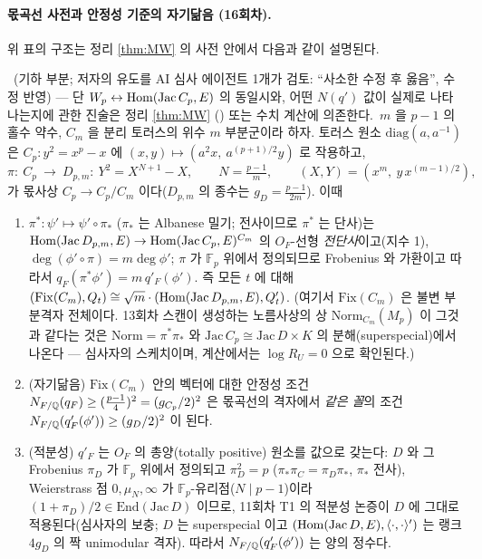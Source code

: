 \paragraph{몫곡선 사전과 안정성 기준의 자기닮음 (16회차).}
위 표의 구조는 정리 \ref{thm:MW} 의 사전 안에서 다음과 같이 설명된다.
\begin{proposition}[몫곡선 사전]\label{prop:quotient}\tagP\ (기하 부분; 저자의 유도를 AI 심사 에이전트 1개가 검토: ``사소한 수정 후 옳음'', 수정 반영) --- 단 $W_p\leftrightarrow\operatorname{Hom}(\mathrm{Jac}\,C_p,E)$ 의 동일시와, 어떤 $N(q')$ 값이 실제로 나타나는지에 관한 진술은 정리 \ref{thm:MW} (\tagPL) 또는 수치 계산에 의존한다.\
$m$ 을 $p-1$ 의 홀수 약수, $C_m$ 을 분리 토러스의 위수 $m$ 부분군이라 하자. 토러스 원소 $\mathrm{diag}(a,a^{-1})$ 은 $C_p:y^2=x^p-x$ 에 $(x,y)\mapsto(a^2x,\ a^{(p+1)/2}y)$ 로 작용하고,
\[
\pi:\ C_p\ \longrightarrow\ D_{p,m}:\ Y^2=X^{N+1}-X,\qquad N=\tfrac{p-1}m,\qquad (X,Y)=(x^m,\ y\,x^{(m-1)/2}),
\]
가 몫사상 $C_p\to C_p/C_m$ 이다($D_{p,m}$ 의 종수는 $g_D=\tfrac{p-1}{2m}$). 이때
\begin{enumerate}
\item $\pi^*:\psi'\mapsto\psi'\circ\pi_*$ ($\pi_*$ 는 Albanese 밀기; 전사이므로 $\pi^*$ 는 단사)는 $\operatorname{Hom}(\mathrm{Jac}\,D_{p,m},E)\to\operatorname{Hom}(\mathrm{Jac}\,C_p,E)^{C_m}$ 의 $O_F$-선형 \emph{전단사}이고(지수 1), $\deg(\phi'\circ\pi)=m\deg\phi'$; $\pi$ 가 $\mathbb F_p$ 위에서 정의되므로 Frobenius 와 가환이고 따라서 $q_F(\pi^*\phi')=m\,q'_F(\phi')$. 즉 모든 $t$ 에 대해 $(\mathrm{Fix}(C_m),Q_t)\cong\sqrt m\cdot(\operatorname{Hom}(\mathrm{Jac}\,D_{p,m},E),Q'_t)$. (여기서 $\mathrm{Fix}(C_m)$ 은 불변 부분격자 전체이다. 13회차 스캔이 생성하는 노름사상의 상 $\mathrm{Norm}_{C_m}(M_p)$ 이 그것과 같다는 것은 $\mathrm{Norm}=\pi^*\pi_*$ 와 $\mathrm{Jac}\,C_p\cong\mathrm{Jac}\,D\times K$ 의 분해(superspecial)에서 나온다 --- 심사자의 스케치이며, 계산에서는 $\log R_U=0$ 으로 확인된다.)
\item (자기닮음) $\mathrm{Fix}(C_m)$ 안의 벡터에 대한 안정성 조건 $N_{F/\mathbb{Q}}(q_F)\ge(\tfrac{p-1}4)^2=(g_{C_p}/2)^2$ 은 몫곡선의 격자에서 \emph{같은 꼴}의 조건 $N_{F/\mathbb{Q}}(q'_F(\phi'))\ge(g_D/2)^2$ 이 된다.
\item (적분성) $q'_F$ 는 $O_F$ 의 총양(totally positive) 원소를 값으로 갖는다: $D$ 와 그 Frobenius $\pi_D$ 가 $\mathbb F_p$ 위에서 정의되고 $\pi_D^2=p$ ($\pi_*\pi_C=\pi_D\pi_*$, $\pi_*$ 전사), Weierstrass 점 $0,\mu_N,\infty$ 가 $\mathbb F_p$-유리점($N\mid p-1$)이라 $(1+\pi_D)/2\in\mathrm{End}(\mathrm{Jac}\,D)$ 이므로, 11회차 T1 의 적분성 논증이 $D$ 에 그대로 적용된다(심사자의 보충; $D$ 는 superspecial 이고 $(\operatorname{Hom}(\mathrm{Jac}\,D,E),\langle\cdot,\cdot\rangle')$ 는 랭크 $4g_D$ 의 짝 unimodular 격자). 따라서 $N_{F/\mathbb{Q}}(q'_F(\phi'))$ 는 양의 정수다.

\end{enumerate}
\end{proposition}
